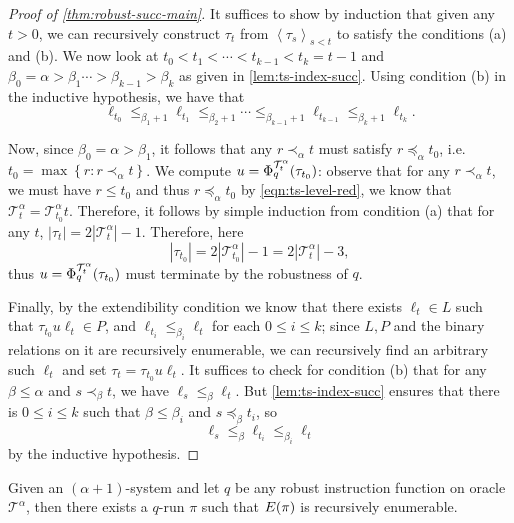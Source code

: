 \documentclass[11pt]{article}
\theoremstyle{plain}
\theoremstyle{definition}
\newcommand{\tuple}[1]{\left\langle #1 \right\rangle}
\begin{document}
\begin{proof}[Proof of \autoref{thm:robust-succ-main}]
  It suffices to show by induction that given any $t > 0$, we can recursively construct $\tau_t$ from $\tuple{\tau_s}_{s < t}$ to satisfy the conditions (a) and (b). We now look at $t_0 < t_1 < \cdots < t_{k - 1} < t_k = t - 1$ and $\beta_0 = \alpha > \beta_1 \cdots > \beta_{k - 1} > \beta_k$ as given in \autoref{lem:ts-index-succ}. Using condition (b) in the inductive hypothesis, we have that
  \[\ell_{t_0} \leq_{\beta_1 + 1} \ell_{t_1} \leq_{\beta_2 + 1} \cdots \leq_{\beta_{k - 1} + 1} \ell_{t_{k - 1}} \leq_{\beta_k + 1} \ell_{t_k}.\]

  Now, since $\beta_0 = \alpha > \beta_1$, it follows that any $r \prec_\alpha t$ must satisfy $r \preceq_\alpha t_0$, i.e.\ $t_0 = \max \left\{r : r \prec_\alpha t\right\}$. We compute $u = \Phi_q^{\mathcal{T}^\alpha_t}\mleft(\tau_{t_0}\mright)$: observe that for any $r \prec_\alpha t$, we must have $r \leq t_0$ and thus $r \preceq_\alpha t_0$ by \autoref{eqn:ts-level-red}, we know that $\mathcal{T}^\alpha_t = \mathcal{T}^\alpha_{t_0} t$. Therefore, it follows by simple induction from condition (a) that for any $t$, $\left|\tau_t\right| = 2\left|\mathcal{T}^\alpha_t\right| - 1$. Therefore, here
  \[\left|\tau_{t_0}\right| = 2\left|\mathcal{T}^\alpha_{t_0}\right| - 1 = 2\left|\mathcal{T}^\alpha_t\right| - 3,\]
  thus $u = \Phi_q^{\mathcal{T}^\alpha_t}\mleft(\tau_{t_0}\mright)$ must terminate by the robustness of $q$.

  Finally, by the extendibility condition we know that there exists $\ell_t \in L$ such that $\tau_{t_0} u \ell_t \in P$, and $\ell_{t_i} \leq_{\beta_i} \ell_t$ for each $0 \leq i \leq k$; since $L, P$ and the binary relations on it are recursively enumerable, we can recursively find an arbitrary such $\ell_t$ and set $\tau_t = \tau_{t_0} u \ell_t$. It suffices to check for condition (b) that for any $\beta \leq \alpha$ and $s \prec_\beta t$, we have $\ell_s \leq_\beta \ell_t$. But \autoref{lem:ts-index-succ} ensures that there is $0 \leq i \leq k$ such that $\beta \leq \beta_i$ and $s \preceq_\beta t_i$, so
  \[\ell_s \leq_\beta \ell_{t_i} \leq_{\beta_i} \ell_t\]
  by the inductive hypothesis.
\end{proof}

\begin{corollary}
  \label{cor:robust-succ-meta}
  Given an $\left(\alpha + 1\right)$-system and let $q$ be any robust instruction function on oracle $\mathcal{T}^\alpha$, then there exists a $q$-run $\pi$ such that $E\mleft(\pi\mright)$ is recursively enumerable.
\end{corollary}
\end{document}
